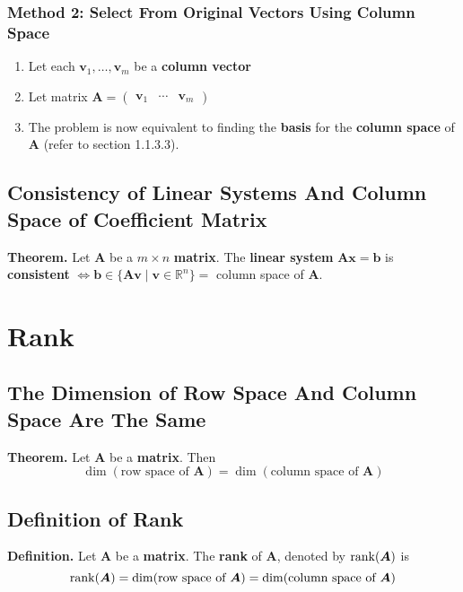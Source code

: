 \documentclass[../ma2001_notes.tex]{subfiles}
\begin{document}
\subsubsection{Method 2: Select From Original Vectors Using Column Space}
\begin{enumerate}
	\item Let each \(\bm{v}_1,\ldots,\bm{v}_m\) be a \textbf{column vector}
	\item Let matrix \(\bm{A}=\begin{pmatrix}
		\bm{v}_1 & \cdots & \bm{v}_m
	\end{pmatrix}\)
	\item The problem is now equivalent to finding the \textbf{basis} for the \textbf{column space} of \(\bm{A}\) (refer to section 1.1.3.3).
\end{enumerate}

\subsection{Consistency of Linear Systems And Column Space of Coefficient Matrix}
\textbf{Theorem.} Let \(\bm{A}\) be a \(m\times n\) \textbf{matrix}. The \textbf{linear system} \(\bm{Ax}=\bm{b}\) is \textbf{consistent} \(\Leftrightarrow\bm{b}\in\{\bm{Av}\mid\bm{v}\in\mathbb{R}^n\}=\) column space of \(\bm{A}\).

\section{Rank}
\subsection{The Dimension of Row Space And Column Space Are The Same}
\textbf{Theorem.} Let \(\bm{A}\) be a \textbf{matrix}. Then
\[\dim(\text{row space of }\bm{A})=\dim(\text{column space of }\bm{A})\]

\subsection{Definition of Rank}
\textbf{Definition.} Let \(\bm{A}\) be a \textbf{matrix}. The \textbf{rank} of \(\bm{A}\), denoted by \(\operatorname{rank}(\bm{A})\) is
\[\operatorname{rank}(\bm{A})=\dim(\text{row space of }\bm{A})=\dim(\text{column space of }\bm{A})\]
\end{document}
